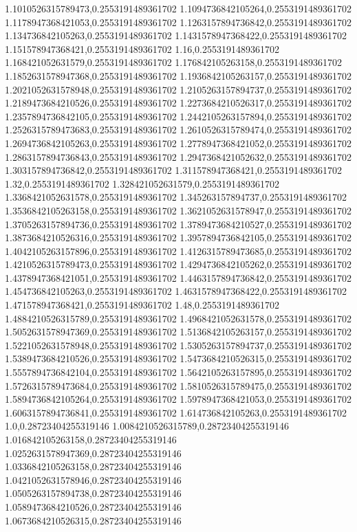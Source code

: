 1.1010526315789473,0.2553191489361702
1.1094736842105264,0.2553191489361702
1.1178947368421053,0.2553191489361702
1.1263157894736842,0.2553191489361702
1.134736842105263,0.2553191489361702
1.1431578947368422,0.2553191489361702
1.151578947368421,0.2553191489361702
1.16,0.2553191489361702
1.168421052631579,0.2553191489361702
1.176842105263158,0.2553191489361702
1.1852631578947368,0.2553191489361702
1.1936842105263157,0.2553191489361702
1.2021052631578948,0.2553191489361702
1.2105263157894737,0.2553191489361702
1.2189473684210526,0.2553191489361702
1.2273684210526317,0.2553191489361702
1.2357894736842105,0.2553191489361702
1.2442105263157894,0.2553191489361702
1.2526315789473683,0.2553191489361702
1.2610526315789474,0.2553191489361702
1.2694736842105263,0.2553191489361702
1.2778947368421052,0.2553191489361702
1.2863157894736843,0.2553191489361702
1.2947368421052632,0.2553191489361702
1.303157894736842,0.2553191489361702
1.311578947368421,0.2553191489361702
1.32,0.2553191489361702
1.328421052631579,0.2553191489361702
1.3368421052631578,0.2553191489361702
1.345263157894737,0.2553191489361702
1.3536842105263158,0.2553191489361702
1.3621052631578947,0.2553191489361702
1.3705263157894736,0.2553191489361702
1.3789473684210527,0.2553191489361702
1.3873684210526316,0.2553191489361702
1.3957894736842105,0.2553191489361702
1.4042105263157896,0.2553191489361702
1.4126315789473685,0.2553191489361702
1.4210526315789473,0.2553191489361702
1.4294736842105262,0.2553191489361702
1.4378947368421051,0.2553191489361702
1.4463157894736842,0.2553191489361702
1.454736842105263,0.2553191489361702
1.4631578947368422,0.2553191489361702
1.471578947368421,0.2553191489361702
1.48,0.2553191489361702
1.4884210526315789,0.2553191489361702
1.4968421052631578,0.2553191489361702
1.5052631578947369,0.2553191489361702
1.5136842105263157,0.2553191489361702
1.5221052631578948,0.2553191489361702
1.5305263157894737,0.2553191489361702
1.5389473684210526,0.2553191489361702
1.5473684210526315,0.2553191489361702
1.5557894736842104,0.2553191489361702
1.5642105263157895,0.2553191489361702
1.5726315789473684,0.2553191489361702
1.5810526315789475,0.2553191489361702
1.5894736842105264,0.2553191489361702
1.5978947368421053,0.2553191489361702
1.6063157894736841,0.2553191489361702
1.614736842105263,0.2553191489361702
1.0,0.28723404255319146
1.0084210526315789,0.28723404255319146
1.016842105263158,0.28723404255319146
1.0252631578947369,0.28723404255319146
1.0336842105263158,0.28723404255319146
1.0421052631578946,0.28723404255319146
1.0505263157894738,0.28723404255319146
1.0589473684210526,0.28723404255319146
1.0673684210526315,0.28723404255319146
